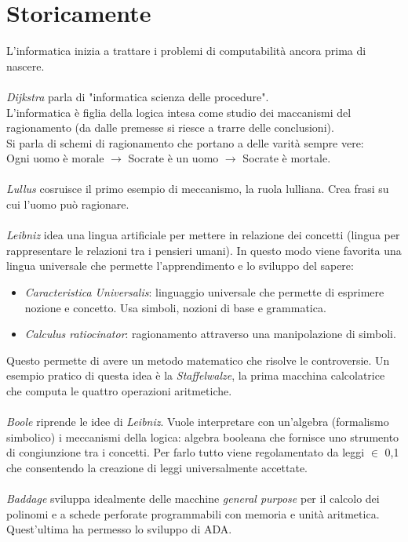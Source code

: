\documentclass[10pt,a4paper]{book}
\begin{document}
\section{Storicamente}
L'informatica inizia a trattare i problemi di computabilit\`a ancora prima di nascere.\\\\
\noindent
\textit{Dijkstra} parla di "informatica scienza delle procedure".\\
L'informatica \`e figlia della logica intesa come studio dei maccanismi del ragionamento (da dalle premesse si riesce a trarre delle conclusioni).\\
Si parla di schemi di ragionamento che portano a delle varit\`a sempre vere:\\
Ogni uomo \`e morale $\longrightarrow$ Socrate \`e un uomo $\longrightarrow$ Socrate \`e mortale.
\\\\
\textit{Lullus} cosruisce il primo esempio di meccanismo, la ruola lulliana. Crea frasi su cui l'uomo pu\`o ragionare.
\\\\
\textit{Leibniz} idea una lingua artificiale per mettere in relazione dei concetti (lingua per rappresentare le relazioni tra i pensieri umani). In questo modo viene favorita una lingua universale che permette l'apprendimento e lo sviluppo del sapere:
\begin{itemize}
\item \textit{Caracteristica Universalis}: linguaggio universale che permette di esprimere nozione e concetto. Usa simboli, nozioni di base e grammatica.
\item \textit{Calculus ratiocinator}: ragionamento attraverso una manipolazione di simboli.
\end{itemize}
\noindent
Questo permette di avere un metodo matematico che risolve le controversie. Un esempio pratico di questa idea \`e la \textit{Staffelwalze}, la prima macchina calcolatrice che computa le quattro operazioni aritmetiche.
\\\\
\textit{Boole} riprende le idee di \textit{Leibniz}. Vuole interpretare con un'algebra (formalismo simbolico) i meccanismi della logica: algebra booleana che fornisce uno strumento di congiunzione tra i concetti. Per farlo tutto viene regolamentato da leggi $\in$ {0,1} che consentendo la creazione di leggi universalmente accettate.\\\\
\textit{Baddage} sviluppa  idealmente delle macchine \textit{general purpose} per il calcolo dei polinomi e a schede perforate programmabili con memoria e unit\`a aritmetica. Quest'ultima ha permesso lo sviluppo di ADA.\\\\
\end{document}
